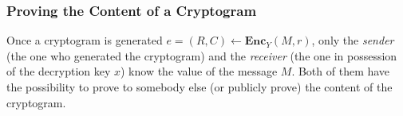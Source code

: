 
    

\subsubsection{Proving the Content of a Cryptogram}
Once a cryptogram is generated \( e = (R, C) \leftarrow \mathbf{Enc}_Y (M, r) \), only the \textit{sender} (the one who generated the cryptogram) and the \textit{receiver} (the one in possession of the decryption key $x$) know the value of the message $M$. Both of them have the possibility to prove to somebody else (or publicly prove) the content of the cryptogram.


